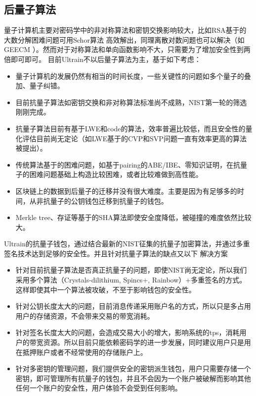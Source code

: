 \documentclass[12pt, UTF8]{article}
\begin{document}
\subsection{后量子算法}
量子计算机主要对密码学中的非对称算法和密钥交换影响较大，比如RSA基于的大数分解困难问题可用Schor算法 高效解出，同理离散对数问题也可以解决（如GEECM ）。然而对于对称算法和单向函数影响不大，只需要为了增加安全性到两倍即可即可。
目前Ultrain不以后量子算法为主，基于如下考虑：
\begin{itemize}
\item 量子计算机的发展仍然有相当的时间长度\cite{aaronson2008limits}，一些关键性的问题如多个量子的叠加、量子纠错。
\item 目前抗量子算法如密钥交换和非对称算法标准尚不成熟，NIST第一轮的筛选刚刚完成。
\item 抗量子算法目前有基于LWE\cite{alkim2016post}和code\cite{cayrel2010post}的算法，效率普遍比较低，而且安全性的量化评估目前尚无定论（如LWE基于的CVP和SVP问题一直有效率更高的算法被提出\cite{lindner2011better}）。
\item 传统算法基于的困难问题，如基于pairing的ABE\cite{waters2011ciphertext}/IBE\cite{boneh2003identity}、零知识证明\cite{parno2013pinocchio}，在抗量子的困难问题基础上构造比较困难，或者比较难做到高性能。
\item 区块链上的数据到后量子的迁移并没有很大难度。主要是因为有足够多的时间，从非抗量子的公钥钱包迁移到抗量子的钱包。
\item Merkle tree、存证等基于的SHA算法即使安全度降低，被碰撞的难度依然比较大。
\end{itemize}

Ultrain的抗量子钱包，通过结合最新的NIST征集的抗量子加密算法，并通过多重签名技术达到足够的安全性。并且针对抗量子算法的缺点又以下 解决方案
\begin{itemize}
\item 针对目前抗量子算法是否真正抗量子的问题，即使NIST尚无定论，所以我们采用多个算法（Crystals-dilithium\cite{ducas2018crystals}, Spincs+\cite{bernstein2015sphincs}, Rainbow\cite{ding2005rainbow}）+多重签名的方式。这样即使其中一个算法被攻破，不至于影响钱包的安全性。
\item 针对公钥长度太大的问题，目前消息传递采用账户名的方式，所以只是多占用用户的存储资源，不会带来交易的带宽消耗。
\item 针对签名长度太大的问题，会造成交易大小的增大，影响系统的tps，消耗用户的带宽资源。所以目前只能依赖密码学的进一步发展，同时建议用户只是用在抵押账户或者不经常使用的存储账户上。
\item 针对多密钥的管理问题，我们提供安全的密钥派生钱包，用户只需要存储一个密钥，即可管理所有抗量子的钱包，并且不会因为一个账户被破解而影响其他任何一个账户的安全性，用户体验不会受到任何影响。
\end{itemize}
\end{document}
